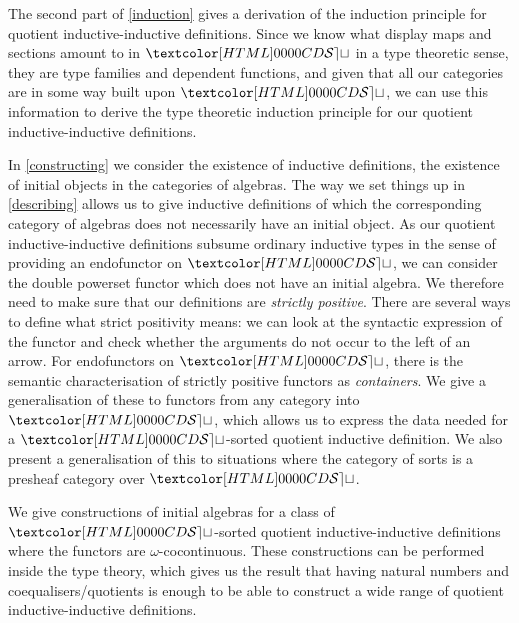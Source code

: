 The second part of \cref{induction} gives a derivation of the
induction principle for quotient inductive-inductive
definitions. Since we know what display maps and sections amount to in
$\SET$ in a type theoretic sense, \ie they are type families and
dependent functions, and given that all our categories are in some way
built upon $\SET$, we can use this information to derive the type
theoretic induction principle for our quotient inductive-inductive
definitions.

In \cref{constructing} we consider the existence of inductive
definitions, \ie the existence of initial objects in the categories of
algebras. The way we set things up in \cref{describing} allows us to
give inductive definitions of which the corresponding category of
algebras does not necessarily have an initial object. As our quotient
inductive-inductive definitions subsume ordinary inductive types in
the sense of providing an endofunctor on $\SET$, we can consider the
double powerset functor which does not have an initial algebra. We
therefore need to make sure that our definitions are \emph{strictly
  positive}. There are several ways to define what strict positivity
means: we can look at the syntactic expression of the functor and
check whether the arguments do not occur to the left of an arrow. For
endofunctors on $\SET$, there is the semantic characterisation of
strictly positive functors as \emph{containers}. We give a
generalisation of these to functors from any category into $\SET$,
which allows us to express the data needed for a $\SET$-sorted
quotient inductive definition. We also present a generalisation of
this to situations where the category of sorts is a presheaf category
over $\SET$. 

We give constructions of initial algebras for a class of $\SET$-sorted
quotient inductive-inductive definitions where the functors are
$\omega$-cocontinuous. These constructions can be performed inside the
type theory, which gives us the result that having natural numbers and
coequalisers/quotients is enough to be able to construct a wide range
of quotient inductive-inductive definitions.

